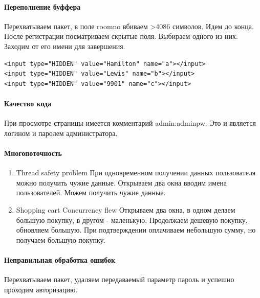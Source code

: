 \documentclass[10pt,a4paper]{article}
\begin{document}
\paragraph{Переполнение буффера}
Перехватываем пакет, в поле roomno вбиваем >4086 символов. Идем до конца. После регистрации посматриваем скрытые поля. Выбираем одного из них. Заходим от его имени для завершения.
\begin{verbatim}
<input type="HIDDEN" value="Hamilton" name="a"></input>
<input type="HIDDEN" value="Lewis" name="b"></input>
<input type="HIDDEN" value="9901" name="c"></input>
\end{verbatim}
\paragraph{Качество кода}
При просмотре страницы имеется комментарий admin:adminpw. Это и является логином и паролем администратора.
\paragraph{Многопоточность}
\begin{enumerate}
\item Thread safety problem
При одновременном получении данных пользователя можно получить чужие данные. Открываем два окна вводим имена пользователей. Можем получить чужие данные.
\item Shopping cart Concurrency flew
Открываем два окна, в одном делаем большую покупку, в другом - маленькую. Продолжаем дешевую покупку, обновляем большую. При подтверждении оплачиваем небольшую сумму, но получаем большую покупку.
\end{enumerate}
\paragraph{Неправильная обработка ошибок}
Перехватываем пакет, удаляем передаваемый параметр пароль и успешно проходим авторизацию.
\end{document}
